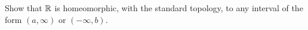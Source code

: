 \begin{comment}

\ExerciseSolution

\ba

\item Suppose $x$ is a limit point of $B$ in the subspace topology for $A$. To show that $x$ is a limit point of $B$ in $X$, let $N$ be a neighborhood of $x$ in $X$. Then $N$ contains an open set $O$ that contains $x$. It follows that $O \cap A$ is a neighborhood of $x$ in $A$. Since $x$ is a limit point of $B$ in $A$, the set $O \cap A$ must contain a point in $B$ different fro $x$. But then $N$ contains a point in $B$ different from $x$ and so $x$ is a limit point of $B$ in $X$.

Conversely, suppose that $x$ is a limit point of $B$ in $X$. To show that $x$ is a limit point of $B$ in $A$, let $N$ be a neighborhood of $x$ in $A$. Then $N$ contains an open set $O$ in $A$ that contains $x$. Since $O$ is open in $A$, there exists an open set $U$ in $X$ such that $O = U \cap A$. But then $U$ is a neighborhood of $x$ in $X$ and so must contain a point in $B$ different from $x$. It follows that $O$ contains a point in $B$ different from $x$, and so does $N$. Therefore, $x$ is a limit point of $B$ in the subspace topology for $A$.

\item The closure of $B$ in $A$ is equal to $B \cup B''$, where $B''$ is the set of limit points of $B$ in $A$, while $\overline{B} = B \cup B'$. So to prove the equality we want, we only need to demonstrate that $B'' = B'$. Part (a) shows exactly this equality. 

\ea

\end{comment}

\item \label{ex:R_intervals} Show that $\mathbb{R}$ is homeomorphic, with the standard topology, to any interval of the form $(a,\infty)$ or $(-\infty,b)$.

